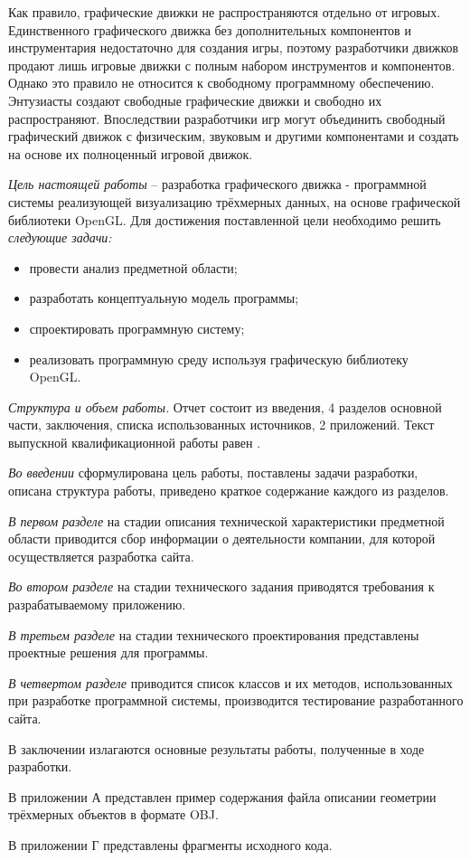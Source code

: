 Как правило, графические движки не распространяются отдельно от игровых. Единственного графического движка без дополнительных компонентов и инструментария недостаточно для создания игры, поэтому разработчики движков продают лишь игровые движки с полным набором инструментов и компонентов. Однако это правило не относится к свободному программному обеспечению. Энтузиасты создают свободные графические движки и свободно их распространяют. Впоследствии разработчики игр могут объединить свободный графический движок с физическим, звуковым и другими компонентами и создать на основе их полноценный игровой движок.

\emph{Цель настоящей работы} – разработка графического движка - программной системы реализующей визуализацию трёхмерных данных, на основе графической библиотеки OpenGL. Для достижения поставленной цели необходимо решить \emph{следующие задачи:}
\begin{itemize}
\item провести анализ предметной области;
\item разработать концептуальную модель программы;
\item спроектировать программную систему;
\item реализовать программную среду используя графическую библиотеку OpenGL.
\end{itemize}

\emph{Структура и объем работы.} Отчет состоит из введения, 4 разделов основной части, заключения, списка использованных источников, 2 приложений. Текст выпускной квалификационной работы равен .

\emph{Во введении} сформулирована цель работы, поставлены задачи разработки, описана структура работы, приведено краткое содержание каждого из разделов.

\emph{В первом разделе} на стадии описания технической характеристики предметной области приводится сбор информации о деятельности компании, для которой осуществляется разработка сайта.

\emph{Во втором разделе} на стадии технического задания приводятся требования к разрабатываемому приложению.

\emph{В третьем разделе} на стадии технического проектирования представлены проектные решения для программы.

\emph{В четвертом разделе} приводится список классов и их методов, использованных при разработке программной системы, производится тестирование разработанного сайта.

В заключении излагаются основные результаты работы, полученные в ходе разработки.

В приложении А представлен пример содержания файла описании геометрии трёхмерных объектов в формате OBJ.


В приложении Г представлены фрагменты исходного кода. 
